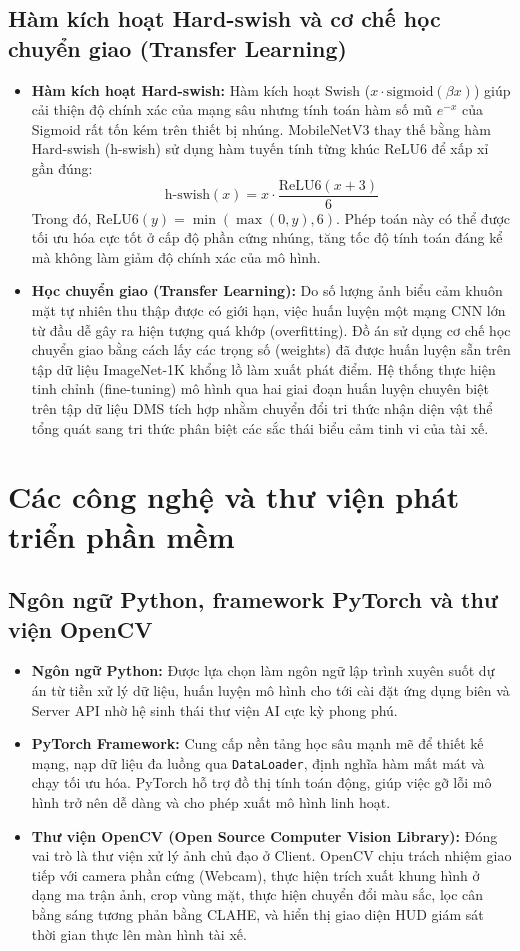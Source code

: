 \documentclass[../DoAn.tex]{subfiles}
\begin{document}
\subsection{Hàm kích hoạt Hard-swish và cơ chế học chuyển giao (Transfer Learning)}
\begin{itemize}
    \item \textbf{Hàm kích hoạt Hard-swish:} Hàm kích hoạt Swish ($x \cdot \text{sigmoid}(\beta x)$) giúp cải thiện độ chính xác của mạng sâu nhưng tính toán hàm số mũ $e^{-x}$ của Sigmoid rất tốn kém trên thiết bị nhúng. MobileNetV3 thay thế bằng hàm Hard-swish (h-swish) sử dụng hàm tuyến tính từng khúc ReLU6 để xấp xỉ gần đúng:
    \[ \text{h-swish}(x) = x \cdot \frac{\text{ReLU6}(x + 3)}{6} \]
    Trong đó, $\text{ReLU6}(y) = \min(\max(0, y), 6)$. Phép toán này có thể được tối ưu hóa cực tốt ở cấp độ phần cứng nhúng, tăng tốc độ tính toán đáng kể mà không làm giảm độ chính xác của mô hình.
    \item \textbf{Học chuyển giao (Transfer Learning):} Do số lượng ảnh biểu cảm khuôn mặt tự nhiên thu thập được có giới hạn, việc huấn luyện một mạng CNN lớn từ đầu dễ gây ra hiện tượng quá khớp (overfitting). Đồ án sử dụng cơ chế học chuyển giao bằng cách lấy các trọng số (weights) đã được huấn luyện sẵn trên tập dữ liệu ImageNet-1K khổng lồ làm xuất phát điểm. Hệ thống thực hiện tinh chỉnh (fine-tuning) mô hình qua hai giai đoạn huấn luyện chuyên biệt trên tập dữ liệu DMS tích hợp nhằm chuyển đổi tri thức nhận diện vật thể tổng quát sang tri thức phân biệt các sắc thái biểu cảm tinh vi của tài xế.
\end{itemize}

\section{Các công nghệ và thư viện phát triển phần mềm}
\label{section:3.3}

\subsection{Ngôn ngữ Python, framework PyTorch và thư viện OpenCV}
\begin{itemize}
    \item \textbf{Ngôn ngữ Python:} Được lựa chọn làm ngôn ngữ lập trình xuyên suốt dự án từ tiền xử lý dữ liệu, huấn luyện mô hình cho tới cài đặt ứng dụng biên và Server API nhờ hệ sinh thái thư viện AI cực kỳ phong phú.
    \item \textbf{PyTorch Framework:} Cung cấp nền tảng học sâu mạnh mẽ để thiết kế mạng, nạp dữ liệu đa luồng qua \texttt{DataLoader}, định nghĩa hàm mất mát và chạy tối ưu hóa. PyTorch hỗ trợ đồ thị tính toán động, giúp việc gỡ lỗi mô hình trở nên dễ dàng và cho phép xuất mô hình linh hoạt.
    \item \textbf{Thư viện OpenCV (Open Source Computer Vision Library):} Đóng vai trò là thư viện xử lý ảnh chủ đạo ở Client. OpenCV chịu trách nhiệm giao tiếp với camera phần cứng (Webcam), thực hiện trích xuất khung hình ở dạng ma trận ảnh, crop vùng mặt, thực hiện chuyển đổi màu sắc, lọc cân bằng sáng tương phản bằng CLAHE, và hiển thị giao diện HUD giám sát thời gian thực lên màn hình tài xế.
\end{itemize}
\end{document}
